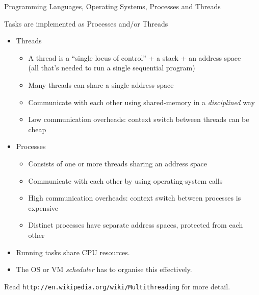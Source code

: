 \documentclass{concdistfoils}
\def\heading#1{\begin{cframed}[8.8in]{#1}\end{cframed}}
\begin{document}
\begin{section}{Programming Languages, Operating Systems, Processes and Threads}
\begin{slide}
\heading{Tasks are implemented as Processes and/or Threads}
\vfill
\begin{itemize}
\item Threads
\begin{itemize}
\item A thread is a ``single locus of control'' + a stack + an address space
\\ (all that's needed to run a single sequential program)
\item Many threads can share a single address space
\item Communicate with each other using shared-memory in a \textit{disciplined} way
\item Low communication overheads: context switch between threads can be cheap
\end{itemize}
\vfill
\item Processes
\begin{itemize}
\item Consists of one or more threads sharing an address space
\item Communicate with each other by using operating-system calls
\item High communication overheads: context switch between processes is expensive 
\item Distinct processes have separate address spaces, protected from each other
\end{itemize}
\vfill
\item Running tasks share CPU resources. 
\item The OS or VM \textit{scheduler} has to organise this effectively.
\end{itemize}
\begin{note}
Read \texttt{http://en.wikipedia.org/wiki/Multithreading} for more detail.
\end{note}
\end{slide}


\end{section}
\end{document}
